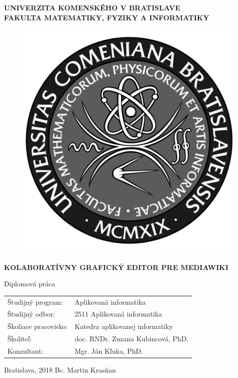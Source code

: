 \documentclass[12pt, a4paper, oneside]{book}
\newcommand\mftitle{Kolaboratívny grafický editor pre MediaWiki}
\newcommand\mfthesistype{Diplomová práca}
\newcommand\mfauthor{Bc. Martin Krasňan}
\newcommand\mfconsultant{Mgr. Ján Kľuka, PhD.}
\newcommand\mfadvisor{doc. RNDr. Zuzana Kubincová, PhD.}
\newcommand\mfplacedate{Bratislava, 2018}
\newcommand\mfuniversity{UNIVERZITA KOMENSKÉHO V BRATISLAVE}
\newcommand\mffaculty{FAKULTA MATEMATIKY, FYZIKY A INFORMATIKY}
\begin{document}
\noindent
\begin{minipage}{\textwidth}
	\begin{center}
		\textbf{\mfuniversity \\
			\mffaculty}
	\end{center}
\end{minipage}


\vfill
\begin{figure}[!hbt]
\begin{center}
\includegraphics{images/base/logo_fmph_dark}
\label{img:logo_dark}
\end{center}
\end{figure}
\begin{center}
\begin{minipage}{0.8\textwidth}
\centerline{\textbf{\Large\MakeUppercase{\mftitle}}}
\smallskip
\centerline{\mfthesistype}
\end{minipage}
\end{center}
\vfill
\begin{tabular}{l l}
Študijný program: & Aplikovaná informatika\\
Študijný odbor: & 2511 Aplikovaná informatika\\
Školiace pracovisko: & Katedra aplikovanej informatiky\\
Školiteľ: & \mfadvisor\\
Konzultant: & \mfconsultant
\end{tabular}
\vfill
\noindent
\mfplacedate \hfill
\mfauthor
\eject 
\end{document}
